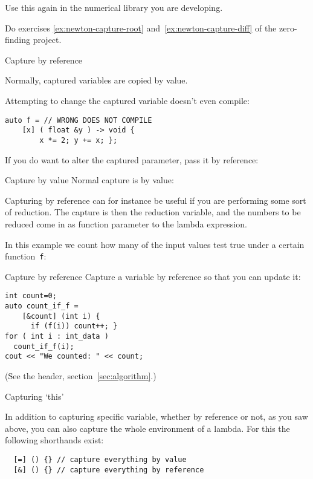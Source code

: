 Use this again in the numerical library you are developing.

\begin{exercise}
  Do exercises \ref{ex:newton-capture-root} and~\ref{ex:newton-capture-diff}
  of the zero-finding project.
\end{exercise}

 {Capture by reference}

Normally, captured variables are copied by value.

Attempting to change the captured variable doesn't even compile:
\begin{lstlisting}
auto f = // WRONG DOES NOT COMPILE
    [x] ( float &y ) -> void {
        x *= 2; y += x; };
\end{lstlisting}

If you do want to alter the captured parameter,
pass it by reference:

\begin{slide}{Capture by value}
  \label{sl:lambda-val-val}
Normal capture is by value:
\end{slide}

Capturing by reference can for instance be useful
if you are performing some sort of reduction.
The capture is then the reduction variable,
and the numbers to be reduced come in as function parameter
to the lambda expression.

In this example we count how many of the input values
test true under a certain function~\lstinline{f}:

\begin{block}{Capture by reference}
  \label{sl:capture-count}
  Capture a variable by reference so that
  you can update it:
\begin{lstlisting}
int count=0;
auto count_if_f = 
    [&count] (int i) {
      if (f(i)) count++; }
for ( int i : int_data )
  count_if_f(i);
cout << "We counted: " << count;
\end{lstlisting}
(See the  header,
section~\ref{sec:algorithm}.)
\end{block}

 {Capturing `this'}

In addition to capturing specific variable,
whether by reference or not,
as you saw above, you can also capture the whole
environment of a lambda.
For this the following shorthands exist:
\begin{lstlisting}
  [=] () {} // capture everything by value
  [&] () {} // capture everything by reference
\end{lstlisting}

